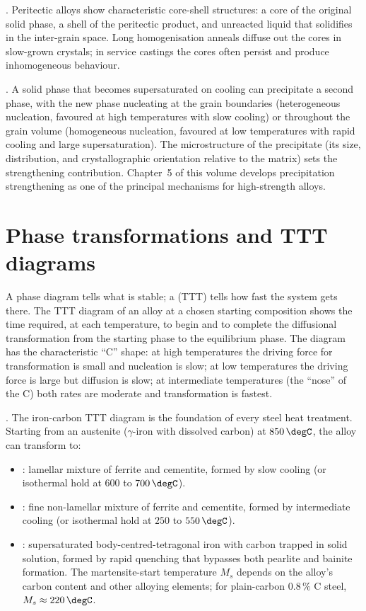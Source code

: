. Peritectic alloys show
characteristic core-shell structures: a core of the original solid
phase, a shell of the peritectic product, and unreacted liquid that
solidifies in the inter-grain space. Long homogenisation anneals
diffuse out the cores in slow-grown crystals; in service castings the
cores often persist and produce inhomogeneous behaviour.

. A solid phase that becomes
supersaturated on cooling can precipitate a second phase, with the
new phase nucleating at the grain boundaries (heterogeneous
nucleation, favoured at high temperatures with slow cooling) or
throughout the grain volume (homogeneous nucleation, favoured at low
temperatures with rapid cooling and large supersaturation). The
microstructure of the precipitate (its size, distribution, and
crystallographic orientation relative to the matrix) sets the
strengthening contribution. Chapter~5 of this volume develops
precipitation strengthening as one of the principal mechanisms for
high-strength alloys.

\section{Phase transformations and TTT diagrams}

A phase diagram tells what is stable; a  (TTT) tells how fast the system gets there.
The TTT diagram of an alloy at a chosen starting composition shows
the time required, at each temperature, to begin and to complete the
diffusional transformation from the starting phase to the equilibrium
phase. The diagram has the characteristic ``C'' shape: at high
temperatures the driving force for transformation is small and
nucleation is slow; at low temperatures the driving force is large
but diffusion is slow; at intermediate temperatures (the ``nose'' of
the C) both rates are moderate and transformation is fastest.

. The iron-carbon TTT diagram is the
foundation of every steel heat treatment. Starting from an austenite
($\gamma$-iron with dissolved carbon) at $850\,\degC$, the alloy can
transform to:

\begin{itemize}[leftmargin=*]
\item {}: lamellar mixture of ferrite and cementite,
  formed by slow cooling (or isothermal hold at $600$ to $700\,\degC$).
\item {}: fine non-lamellar mixture of ferrite and
  cementite, formed by intermediate cooling (or isothermal hold at
  $250$ to $550\,\degC$).
\item {}: supersaturated body-centred-tetragonal
  iron with carbon trapped in solid solution, formed by rapid
  quenching that bypasses both pearlite and bainite formation. The
  martensite-start temperature $M_s$ depends on the alloy's carbon
  content and other alloying elements; for plain-carbon $0.8\,\%$ C
  steel, $M_s \approx 220\,\degC$.
\end{itemize}

